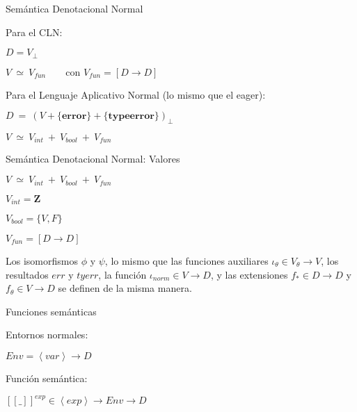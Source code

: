 \documentclass[handout]{beamer}
\newcommand{\sem}[2]{[\![#1]\!]_{#2}}
\newcommand{\var}{\left\langle var\right\rangle}
\newcommand{\ex}{\left\langle exp\right\rangle}
\begin{document}


\begin{frame}{Semántica Denotacional Normal}

Para el CLN:  

\bigskip

\qquad\qquad $D = V_{\perp}$


\bigskip 

\qquad\qquad$V\ \simeq \ V_{fun}\qquad \text{con } V_{fun}= [D\rightarrow D]$\pause

\bigskip 

\bigskip

Para el Lenguaje Aplicativo Normal (lo mismo que el eager): 


\bigskip

\qquad\qquad$D\ = \ (V + \{\textbf{error}\} + \{\textbf{typeerror}\})_\perp$

\bigskip

\qquad\qquad$V\ \simeq\ V_{int}\ +\ V_{bool}\ +\ V_{fun}$


\end{frame}





\begin{frame}{Semántica Denotacional Normal: Valores}


$V\ \simeq\ V_{int}\ +\ V_{bool}\ +\ V_{fun}$

\bigskip

\bigskip


$V_{int}=\textbf{Z}$

\smallskip

$V_{bool}=\{V,F\}$

\smallskip

$V_{fun}= [D\rightarrow D]$\pause
\medskip

\medskip

Los isomorfismos $\phi$ y $\psi$, lo mismo que las funciones auxiliares $\iota_{\theta}\in V_{\theta}\rightarrow V$, los resultados $err$ y $tyerr$, la función $\iota_{norm} \in V \rightarrow D$, y las extensiones $f_{*}\in D\rightarrow D$ y $f_{\theta} \in V\rightarrow D$  se definen de la misma manera. 
\end{frame}



\begin{frame}{Funciones semánticas}

Entornos normales: 

\medskip


$Env = \var \rightarrow D$ \pause


\bigskip


\bigskip

Función semántica:

\medskip

$\sem{ \_ }{}^{exp} \in \ex \rightarrow Env \rightarrow D$

\bigskip


\end{frame}
\end{document}
